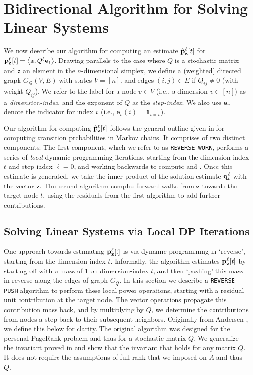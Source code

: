 \section{Bidirectional Algorithm for Solving Linear Systems}

We now describe our algorithm for computing an estimate $\hat{\mathbf{p}}_\mathbf{z}^{\ell}[t]$ for ${\mathbf{p}}_\mathbf{z}^{\ell}[t] =\left< \mathbf{z}, Q^{\ell}\mathbf{e}_t \right>$.
Drawing parallels to the case where $Q$ is a stochastic matrix and $\mathbf{z}$ an element in the $n$-dimensional simplex, we define a (weighted) directed graph $G_Q(V,E)$ with states $V = [n]$, and edges $(i,j)\in E$ if $Q_{ij}\neq 0$ (with weight $Q_{ij}$).
We refer to the label for a node $v\in V$ (i.e., a dimension $v\in[n]$) as a \emph{dimension-index}, and the exponent of $Q$ as the \emph{step-index}.
We also use $\mathbf{e}_v$ denote the indicator for index $v$ (i.e., $\mathbf{e}_v(i) = \mathds{1}_{i=v}$). 

Our algorithm for computing $\hat{\mathbf{p}}_\mathbf{z}^{\ell}[t]$ follows the general outline given in \cite{banerjee2015fast} for computing transition probabilities in Markov chains.
It comprises of two distinct components:
The first component, which we refer to as \texttt{\texttt{REVERSE-WORK}}, performs a series of \emph{local} dynamic programming iterations, starting from the dimension-index $t$ and step-index $\ell=0$, and working backwards to compute and . 
Once this estimate is generated, we take the inner product of the solution estimate $\mathbf{q}^{\ell}_t$ with the vector $\mathbf{z}$. The second algorithm samples forward walks from $\mathbf{z}$ towards the target node $t$, using the residuals from the first algorithm to add further contributions.

\subsection{Solving Linear Systems via Local DP Iterations}
\label{ssec:reverse}

One approach towards estimating ${\mathbf{p}}_\mathbf{z}^{\ell}[t]$ is via dynamic programming in `reverse', starting from the dimension-index $t$.
Informally, the algorithm estimates ${\mathbf{p}}_\mathbf{z}^{\ell}[t]$ by starting off with a mass of $1$ on dimension-index $t$, and then `pushing' this mass in reverse along the edges of graph $G_Q$. 
In this section we describe a \texttt{REVERSE-PUSH} algorithm to perform these local power operations, starting with a residual unit contribution at the target node. The vector operations propagate this contribution mass back, and by multiplying by $Q$, we determine the contributions from nodes a step back to their subsequent neighbors. Originally from Andersen \cite{andersen2007local}, we define this below for clarity. The original algorithm was designed for the personal PageRank problem and thus for a stochastic matrix $Q$. 
We generalize the invariant proved in \cite{andersen2007local, banerjee2015fast} and show that the invariant that holds for any matrix $Q$. It does not require the assumptions of full rank that we imposed on $A$ and thus $Q$.
 
